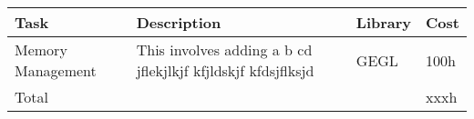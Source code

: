 
\begin{flushleft}		
\begin{tabular}{|l|p{5cm}|l|l|}\hline
\hline
Task & Description & Library & Cost\\ \hline 
Memory Management & This involves adding a b cd jflekjlkjf kfjldskjf kfdsjflksjd & GEGL & 100h\\ 
\hline

\hline
Total&&&xxxh\\
\end{tabular}
\end{flushleft}

	
